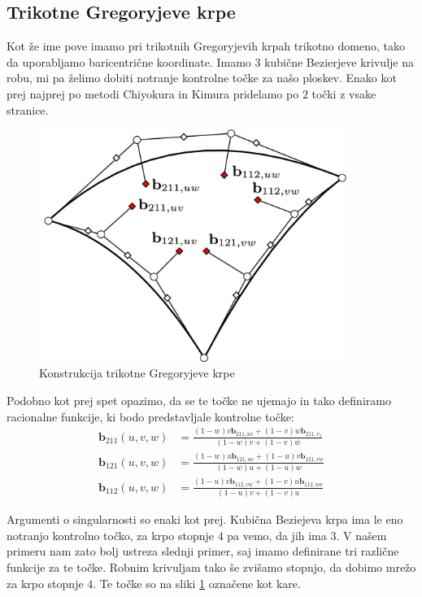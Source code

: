 \documentclass[a4paper,12pt]{article}
\newcommand{\tbf}{\textbf}
\begin{document}
\subsection{Trikotne Gregoryjeve krpe}
Kot že ime pove imamo pri trikotnih Gregoryjevih krpah trikotno domeno, tako da uporabljamo baricentrične koordinate. Imamo $3$ kubične Bezierjeve krivulje na robu, mi pa želimo dobiti notranje kontrolne točke za našo ploskev. Enako kot prej najprej po metodi Chiyokura in Kimura pridelamo po $2$ točki z vsake stranice.
\begin{figure}[h]
	\centering
	\includegraphics[width=10cm]{gregory_krpe_trikotna.jpg}
	\caption{Konstrukcija trikotne Gregoryjeve krpe}
	\label{fig:trikotna}
\end{figure}

Podobno kot prej spet opazimo, da se te točke ne ujemajo in tako definiramo racionalne funkcije, ki bodo predstavljale kontrolne točke:
\begin{align*}
\tbf{b}_{211}(u,v,w) &= \frac{(1-w)v \tbf{b}_{211,uv}+(1-v)w\tbf{b}_{211,v_1}}{(1-w)v+(1-v)w} \\
\tbf{b}_{121}(u,v,w) &= \frac{(1-w)u \tbf{b}_{121,uv}+(1-u)v\tbf{b}_{121,vw}}{(1-w)u+(1-u)w} \\
\tbf{b}_{112}(u,v,w) &= \frac{(1-u)v \tbf{b}_{112,vw}+(1-v)u\tbf{b}_{112,uw}}{(1-u)v+(1-v)u} 
\end{align*}

Argumenti o singularnosti so enaki kot prej. Kubična Beziejeva krpa ima le eno notranjo kontrolno točko, za krpo stopnje $4$ pa vemo, da jih ima $3$. V našem primeru nam zato bolj ustreza slednji primer, saj imamo definirane tri različne funkcije za te točke. Robnim krivuljam tako še zvišamo stopnjo, da dobimo mrežo za krpo stopnje $4$. Te točke so na sliki \ref{fig:trikotna} označene kot kare.
\end{document}

